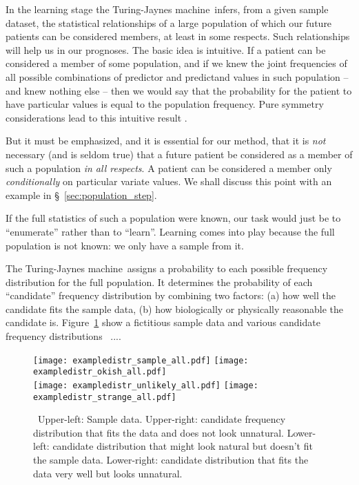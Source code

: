 \documentclass[utf8]{FrontiersinHarvard} %
\newcommand*{\pencil}{{\fontencoding{U}\fontfamily{fontawesometwo}\selectfont\symbol{210}}}
\newcommand{\mynotep}[1]{{\color{notecolour}\pencil\ #1}}
\newcommand*{\sect}{\S}%
\newcommand*{\sects}{\S\S}%
\renewcommand*{\|}[1][]{\nonscript\:#1\vert\nonscript\:\mathopen{}}
\newcommand*{\tjm}{Turing-Jaynes machine}
\begin{document}
In the learning stage the \tjm\ infers, from a given sample dataset, the statistical relationships of a large population of which our future patients can be considered members, at least in some respects. Such relationships will help us in our prognoses. The basic idea is intuitive. If a patient can be considered a member of some population, and if we knew the joint frequencies of all possible combinations of predictor and predictand values in such population -- and knew nothing else -- then we would say that the probability for the patient to have particular values is equal to the population frequency. Pure symmetry considerations lead to this intuitive result \citep[\sects~4.2--4.3]{definetti1930,dawid2013,bernardoetal1994_r2000}.

But it must be emphasized, and it is essential for our method, that it is \emph{not} necessary (and is seldom true) that a future patient be considered as a member of such a population \emph{in all respects}. A patient can be considered a member only \emph{conditionally} on particular variate values. We shall discuss this point with an example in \sect~\ref{sec:population_step}.

If the full statistics of such a population were known, our task would just be to \enquote{enumerate} rather than to \enquote{learn}. Learning comes into play because the full population is not known: we only have a sample from it.

The \tjm\ assigns a probability to each possible frequency distribution for the full population. It determines the probability of each \enquote{candidate} frequency distribution by combining two factors: (a) how well the candidate fits the sample data, (b) how biologically or physically reasonable the candidate is. Figure~\ref{fig:inferring_distribution} show a fictitious sample data and various candidate frequency distributions \mynotep{...}.
\begin{figure}[!t]%
  \centering%
  \texttt{[image: exampledistr\_sample\_all.pdf]}
  \hfill
  \texttt{[image: exampledistr\_okish\_all.pdf]}
  \\
  \texttt{[image: exampledistr\_unlikely\_all.pdf]}
  \hfill
  \texttt{[image: exampledistr\_strange\_all.pdf]}
  \caption{\mynotep{Upper-left: Sample data.
      Upper-right: candidate frequency distribution that fits the data and does not look unnatural.
      Lower-left: candidate distribution that might look natural but doesn't fit the sample data.
      Lower-right: candidate distribution that fits the data very well but looks unnatural.}}\label{fig:inferring_distribution}
\end{figure}%
\end{document}

